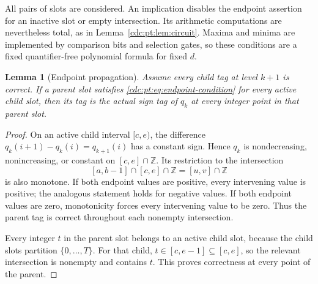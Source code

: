 \documentclass[11pt,a4paper]{article}
\newtheorem{lemma}[lemma]{Lemma}
\theoremstyle{definition}
\theoremstyle{remark}
\newcommand{\Z}{\mathbb Z}
\begin{document}
All pairs of slots are considered. An implication disables the endpoint
assertion for an inactive slot or empty intersection. Its arithmetic
computations are nevertheless total, as in Lemma~\ref{cdc:pt:lem:circuit}.
Maxima and minima are implemented by comparison bits and selection gates,
so these conditions are a fixed quantifier-free polynomial formula for
fixed $d$.

\begin{lemma}[Endpoint propagation]
\label{cdc:pt:lem:propagation}
Assume every child tag at level $k+1$ is correct. If a parent slot satisfies
\eqref{cdc:pt:eq:endpoint-condition} for every active child slot, then its tag is
the actual sign tag of $q_k$ at every integer point in that parent slot.
\end{lemma}
\begin{proof}
On an active child interval $[c,e)$, the difference
$q_k(i+1)-q_k(i)=q_{k+1}(i)$ has a constant sign. Hence $q_k$ is
nondecreasing, nonincreasing, or constant on $[c,e]\cap\Z$.
Its restriction to the intersection
\[
 [a,b-1]\cap[c,e]\cap\Z=[u,v]\cap\Z
\]
is also monotone. If both endpoint values are positive, every intervening
value is positive; the analogous statement holds for negative values. If
both endpoint values are zero, monotonicity forces every intervening value
to be zero. Thus the parent tag is correct throughout each nonempty
intersection.

Every integer $t$ in the parent slot belongs to an active child slot,
because the child slots partition $\{0,\ldots,T\}$. For that child,
$t\in[c,e-1]\subseteq[c,e]$, so the relevant intersection is nonempty and
contains $t$. This proves correctness at every point of the parent.
\end{proof}
\end{document}
